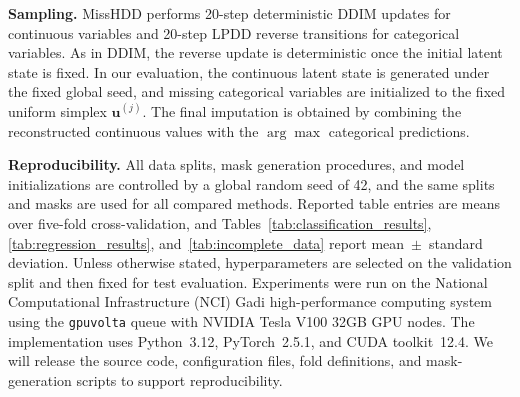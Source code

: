 \documentclass[times, review, 10pt]{elsarticle}
\newcommand{\DIFaddbegin}{\begingroup\color{blue}}
\newcommand{\DIFaddend}{\endgroup}
\begin{document}
\textbf{Sampling.}
MissHDD performs 20-step deterministic DDIM updates for continuous variables
\DIFaddbegin
and 20-step LPDD reverse transitions for categorical variables. As in DDIM,
the reverse update is deterministic once the initial latent state is fixed. In
our evaluation, the continuous latent state is generated under the fixed global
seed, and missing categorical variables are initialized to the fixed uniform
simplex $\mathbf{u}^{(j)}$. The final imputation is obtained by combining the
reconstructed continuous values with the $\arg\max$ categorical predictions.

\textbf{Reproducibility.}
All data splits, mask generation procedures, and model initializations are
controlled by a global random seed of 42, and the same splits and masks are used for
all compared methods. Reported table entries are means over five-fold
cross-validation, and Tables~\ref{tab:classification_results},
\ref{tab:regression_results}, and~\ref{tab:incomplete_data} report
mean~$\pm$~standard deviation. Unless otherwise stated, hyperparameters are selected on the
validation split and then fixed for test evaluation. Experiments were run on
the National Computational Infrastructure (NCI) Gadi high-performance
computing system using the \texttt{gpuvolta} queue with NVIDIA Tesla V100
32GB GPU nodes. The implementation uses Python~3.12, PyTorch~2.5.1, and
CUDA toolkit~12.4.
We will release the source code, configuration files, fold definitions, and
mask-generation scripts to support reproducibility.
\DIFaddend





\DIFaddbegin
\DIFaddend
\DIFaddbegin
\DIFaddend
\DIFaddbegin
\DIFaddend
\end{document}
